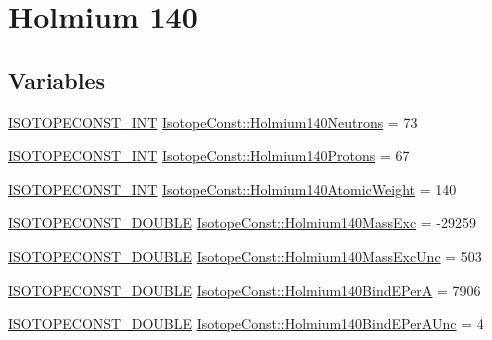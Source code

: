 \hypertarget{group___isotope_const-_holmium-_ho140}{}\section{Holmium 140}
\label{group___isotope_const-_holmium-_ho140}
\subsection*{Variables}
\begin{DoxyCompactItemize}
\item 
\mbox{\hyperlink{group___isotope_const-_macros_ga5f18360b3e99483a35c32d789e62621c}{I\+S\+O\+T\+O\+P\+E\+C\+O\+N\+S\+T\+\_\+\+I\+NT}} \mbox{\hyperlink{group___isotope_const-_holmium-_ho140_ga0898554c2f4371c4c7eab9f3b697fb9b}{Isotope\+Const\+::\+Holmium140\+Neutrons}} = 73
\item 
\mbox{\hyperlink{group___isotope_const-_macros_ga5f18360b3e99483a35c32d789e62621c}{I\+S\+O\+T\+O\+P\+E\+C\+O\+N\+S\+T\+\_\+\+I\+NT}} \mbox{\hyperlink{group___isotope_const-_holmium-_ho140_gae383ee4bf5a770112762b9f55b8080b7}{Isotope\+Const\+::\+Holmium140\+Protons}} = 67
\item 
\mbox{\hyperlink{group___isotope_const-_macros_ga5f18360b3e99483a35c32d789e62621c}{I\+S\+O\+T\+O\+P\+E\+C\+O\+N\+S\+T\+\_\+\+I\+NT}} \mbox{\hyperlink{group___isotope_const-_holmium-_ho140_gaee6ef67f5cd4c3b4ccc8118b2619f7ea}{Isotope\+Const\+::\+Holmium140\+Atomic\+Weight}} = 140
\item 
\mbox{\hyperlink{group___isotope_const-_macros_ga8f45a7272ce02c0b4c65c44636ed719a}{I\+S\+O\+T\+O\+P\+E\+C\+O\+N\+S\+T\+\_\+\+D\+O\+U\+B\+LE}} \mbox{\hyperlink{group___isotope_const-_holmium-_ho140_ga802b09ef9cc263d77a7aee614bfdcc76}{Isotope\+Const\+::\+Holmium140\+Mass\+Exc}} = -\/29259
\item 
\mbox{\hyperlink{group___isotope_const-_macros_ga8f45a7272ce02c0b4c65c44636ed719a}{I\+S\+O\+T\+O\+P\+E\+C\+O\+N\+S\+T\+\_\+\+D\+O\+U\+B\+LE}} \mbox{\hyperlink{group___isotope_const-_holmium-_ho140_ga578771a70cdeaa841bbbc5b6322e1019}{Isotope\+Const\+::\+Holmium140\+Mass\+Exc\+Unc}} = 503
\item 
\mbox{\hyperlink{group___isotope_const-_macros_ga8f45a7272ce02c0b4c65c44636ed719a}{I\+S\+O\+T\+O\+P\+E\+C\+O\+N\+S\+T\+\_\+\+D\+O\+U\+B\+LE}} \mbox{\hyperlink{group___isotope_const-_holmium-_ho140_gac400e081fa72f565cce8642ca835a426}{Isotope\+Const\+::\+Holmium140\+Bind\+E\+PerA}} = 7906
\item 
\mbox{\hyperlink{group___isotope_const-_macros_ga8f45a7272ce02c0b4c65c44636ed719a}{I\+S\+O\+T\+O\+P\+E\+C\+O\+N\+S\+T\+\_\+\+D\+O\+U\+B\+LE}} \mbox{\hyperlink{group___isotope_const-_holmium-_ho140_ga77adb25da0b81d80c15593a3f9f902fc}{Isotope\+Const\+::\+Holmium140\+Bind\+E\+Per\+A\+Unc}} = 4

\end{DoxyCompactItemize}
